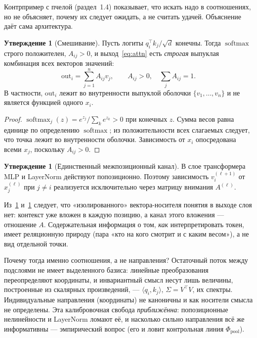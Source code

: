 \documentclass[11pt,a4paper]{article}
\theoremstyle{definition}
\newtheorem{proposition}[definition]{Утверждение}
\theoremstyle{plain}
\DeclareMathOperator{\softmax}{softmax}
\begin{document}
Контрпример с пчелой (раздел~1.4) показывает, что искать надо в соотношениях, но не объясняет,
почему их следует ожидать, а не считать удачей. Объяснение даёт сама архитектура.

\begin{proposition}[Смешивание]\label{prop:mixing}
Пусть логиты $q_i^\top k_j/\sqrt d$ конечны. Тогда $\softmax$ строго положителен,
$A_{ij}>0$, и выход~\eqref{eq:attn} есть \emph{строгая} выпуклая комбинация всех векторов
значений:
\[
\mathrm{out}_i=\sum_{j=1}^{n}A_{ij}v_j,\qquad A_{ij}>0,\quad \sum_j A_{ij}=1 .
\]
В частности, $\mathrm{out}_i$ лежит во внутренности выпуклой оболочки $\{v_1,\dots,v_n\}$ и не
является функцией одного $x_i$.
\end{proposition}
\begin{proof}
$\softmax_j(z)=e^{z_j}/\sum_k e^{z_k}>0$ при конечных $z$. Сумма весов равна единице по
определению $\softmax$; из положительности всех слагаемых следует, что точка лежит во
внутренности оболочки. Зависимость от $x_i$ опосредована всеми $x_j$, поскольку $A_{ij}>0$.
\end{proof}

\begin{proposition}[Единственный межпозиционный канал]\label{prop:channel}
В слое трансформера MLP и LayerNorm действуют попозиционно. Поэтому зависимость
$v_i^{(\ell+1)}$ от $x_j^{(\ell)}$ при $j\ne i$ реализуется исключительно через матрицу
внимания $A^{(\ell)}$.
\end{proposition}

Из~\ref{prop:mixing} и~\ref{prop:channel} следует, что «изолированного» вектора-носителя
понятия в выходе слоя нет: контекст уже вложен в каждую позицию, а канал этого вложения —
отношение $A$. Содержательная информация о том, \emph{как} интерпретировать токен, имеет
реляционную природу (пара «кто на кого смотрит и с каким весом»), а не вид отдельной точки.

Почему тогда именно соотношения, а не направления? Остаточный поток между подслоями не имеет
выделенного базиса: линейные преобразования переопределяют координаты, и инвариантный смысл
несут лишь величины, построенные из скалярных произведений, — $\langle q_i,k_j\rangle$,
$\Sigma=V^\top V$, их спектры. Индивидуальные направления (координаты) не каноничны и как
носители смысла не определены. Эта калибровочная свобода \emph{приближённа}: попозиционные
нелинейности и LayerNorm ломают её, и насколько сильно направления всё же информативны —
эмпирический вопрос (его и ловит контрольная линия $\Phi_{\mathrm{pool}}$).
\end{document}
